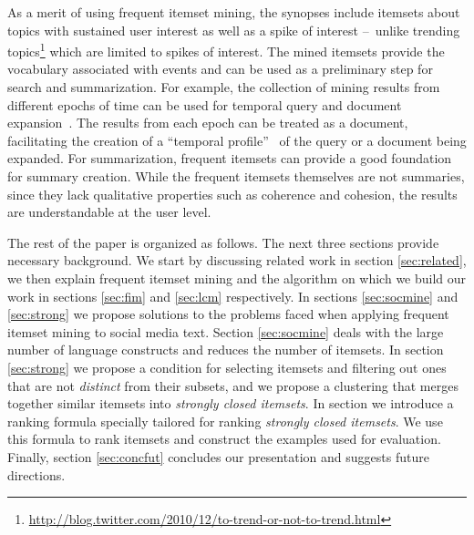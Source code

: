 \documentclass{sig-alternate}
\begin{document}


As a merit of using frequent itemset mining, the synopses include
itemsets about topics with sustained user interest as well as a spike of interest
--~unlike trending topics\footnote{\scriptsize \url{http://blog.twitter.com/2010/12/to-trend-or-not-to-trend.html}}
\cite{mathioudakis2010twittermonitor} which are limited to spikes of interest.
The mined itemsets provide the vocabulary associated with events and can be
used as a preliminary step for search and summarization.
For example, the collection of mining results from different epochs of time
can be used for temporal query and document
expansion~\cite{choi2012temporal, efron2012improving}. %
The results from each epoch can be treated as a document, facilitating the
creation of a ``temporal profile''~\cite{jones2007temporal} of the query
or a document being expanded.
For summarization, frequent itemsets can provide a good foundation for summary
creation.
While the frequent itemsets themselves are not summaries, since they lack
qualitative properties such as coherence and cohesion, the results are
understandable at the user level.

The rest of the paper is organized as follows.
The next three sections provide necessary background.
We start by discussing related work in section \ref{sec:related},
we then explain frequent itemset mining and the algorithm on which we build
our work in sections \ref{sec:fim} and \ref{sec:lcm} respectively.
In sections \ref{sec:socmine} and \ref{sec:strong} we
propose solutions to the problems faced when applying frequent
itemset mining to social media text. 
Section \ref{sec:socmine} deals with the large number of language
constructs and reduces the number of itemsets.
In section  \ref{sec:strong} we propose a condition for selecting
itemsets and filtering out ones that are not \emph{distinct} from 
their subsets, and we propose a clustering that merges
together similar itemsets into \emph{strongly closed itemsets}.
In section \label{sec:rank} we introduce a ranking formula
specially tailored for ranking \emph{strongly closed itemsets}.
We use this formula to rank itemsets and construct 
the examples used for evaluation. %
Finally, section \ref{sec:concfut} concludes our presentation and
suggests future directions.
\end{document}
